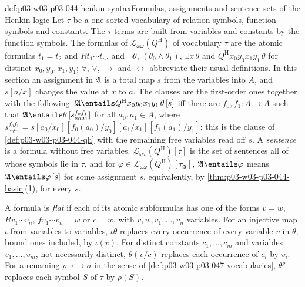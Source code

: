 \begin{hbconvention}{def:p03-w03-p03-044-henkin-syntax}{Formulas, assignments and sentence sets of the Henkin logic}
Let \(\tau\) be a one-sorted vocabulary of relation symbols, function
symbols and constants.  The \(\tau\)-terms are built from variables and
constants by the function symbols.  The formulas of
\(\mathscr L_{\omega\omega}(Q^{\mathrm H})\) of vocabulary \(\tau\) are the
atomic formulas \(t_1=t_2\) and \(Rt_1\cdots t_n\), and \(\neg\theta\),
\((\theta_0\land\theta_1)\), \(\exists x\,\theta\) and
\(Q^{\mathrm H}x_0y_0x_1y_1\,\theta\) for distinct \(x_0,y_0,x_1,y_1\);
\(\forall\), \(\lor\), \(\to\) and \(\leftrightarrow\) abbreviate their
usual definitions.  In this section an assignment in \(\mathfrak A\) is a
total map \(s\) from the variables into \(A\), and \(s[a/x]\) changes the
value at \(x\) to \(a\).  The clauses are the first-order ones together
with the following: \(\mathfrak A\entails Q^{\mathrm
H}x_0y_0x_1y_1\,\theta\,[s]\) iff there are \(f_0,f_1:A\to A\) such that
\(\mathfrak A\entails\theta\,[s^{f_0f_1}_{a_0a_1}]\) for all
\(a_0,a_1\in A\), where \(s^{f_0f_1}_{a_0a_1}=s[a_0/x_0][f_0(a_0)/y_0][a_1/x_1][f_1(a_1)/y_1]\);
this is the clause of \cref{def:p03-w03-p03-044-qh} with the remaining free
variables read off \(s\).  A \emph{sentence} is a formula without free
variables.  \(\mathscr L_{\omega\omega}(Q^{\mathrm H})[\tau]\) is the set of
sentences all of whose symbols lie in \(\tau\), and for
\(\varphi\in\mathscr L_{\omega\omega}(Q^{\mathrm H})[\tau_{\mathfrak A}]\),
\(\mathfrak A\entails\varphi\) means \(\mathfrak A\entails\varphi\,[s]\) for
some assignment \(s\), equivalently, by
\cref{thm:p03-w03-p03-044-basic}(1), for every \(s\).

A formula is \emph{flat} if each of its atomic subformulas has one of the
forms \(v=w\), \(Rv_1\cdots v_n\), \(fv_1\cdots v_n=w\) or \(c=w\), with
\(v,w,v_1,\ldots,v_n\) variables.  For an injective map \(\iota\) from
variables to variables, \(\iota\theta\) replaces every occurrence of every
variable \(v\) in \(\theta\), bound ones included, by \(\iota(v)\).  For
distinct constants \(c_1,\ldots,c_m\) and variables \(v_1,\ldots,v_m\), not
necessarily distinct, \(\theta(\bar v/\bar c)\) replaces each occurrence of
\(c_i\) by \(v_i\).  For a renaming \(\rho:\tau\to\sigma\) in the sense of
\cref{def:p03-w03-p03-047-vocabularies}, \(\theta^\rho\) replaces each symbol
\(S\) of \(\tau\) by \(\rho(S)\).
\end{hbconvention}

